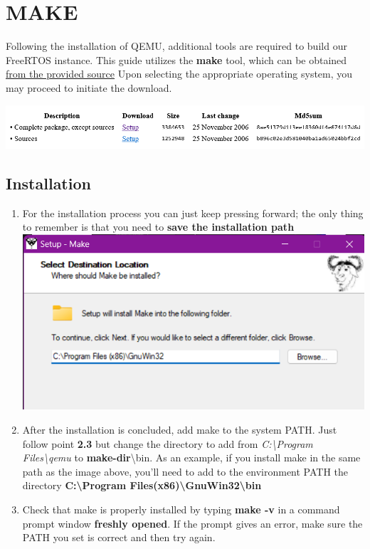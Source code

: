 \documentclass{article}
\begin{document}
\section{MAKE}

Following the installation of QEMU, additional tools are required to build our FreeRTOS instance. This guide utilizes the \textbf{make} tool, which can be obtained \href{https://gnuwin32.sourceforge.net/packages/make.htms}{from the provided source} Upon selecting the appropriate operating system, you may proceed to initiate the download.

\includegraphics[width=\textwidth]{2a}

\subsection{Installation}
\begin{enumerate}
    \item For the installation process you can just keep pressing forward; the only thing to remember is that you need to \textbf{save the installation path}
    \includegraphics[width=\textwidth]{2b}
    \item After the installation is concluded, add make to the system PATH. Just follow point \textbf{2.3} but change the directory to add from \textit{C:\textbackslash Program Files\textbackslash qemu} to \textbf{make-dir}\textbackslash bin. As an example, if you install make in the same path as the image above, you'll need to add to the environment PATH the directory \textbf{C:\textbackslash Program Files(x86)\textbackslash GnuWin32\textbackslash bin}
    \item Check that make is properly installed by typing \textbf{make -v} in a command prompt window \textbf{freshly opened}. If the prompt gives an error, make sure the PATH you set is correct and then try again.
\end{enumerate}
\end{document}
